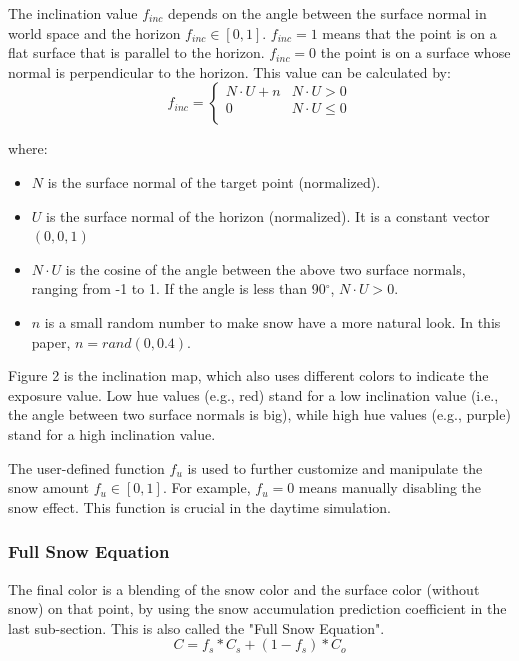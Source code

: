 \documentclass{article}
\begin{document}
The inclination value \( f_{inc} \) depends on the angle between the surface normal in world space and the horizon 
\( f_{inc} \in [0, 1] \). \( f_{inc}=1 \) means that the point is on a flat surface that is parallel to the horizon. 
\( f_{inc}=0 \) the point is on a surface whose normal is perpendicular to the horizon. This value can be calculated by:
\[
  f_{inc}=
  \left\{
    \begin{array}{ll}
      N \cdot U + n & N \cdot U > 0 \\
      0 & N \cdot U \leq 0 \\
    \end{array} 
  \right. 
\]

where:
\begin{itemize}
  \item \( N \) is the surface normal of the target point (normalized).
  \item \( U \) is the surface normal of the horizon (normalized). It is a constant vector \((0, 0, 1)\)
  \item \( N \cdot U \) is the cosine of the angle between the above two surface normals, ranging from -1 to 1. If the angle is less 
  than 90$^{\circ}$, \( N \cdot U > 0\).
  \item \( n \) is a small random number to make snow have a more natural look. In this paper, \(n = rand(0, 0.4)\).
\end{itemize}

Figure 2 is the inclination map, which also uses different colors to indicate the exposure value. Low hue values (e.g., red) stand for 
a low inclination value (i.e., the angle between two surface normals is big), while high hue values (e.g., purple) stand for a high 
inclination value.

The user-defined function \( f_{u} \) is used to further customize and manipulate the snow amount \( f_{u} \in [0, 1] \). For example, 
\( f_{u}=0 \) means manually disabling the snow effect. This function is crucial in the daytime simulation.

\subsubsection {Full Snow Equation}
The final color is a blending of the snow color and the surface color (without snow) on that point, by using the snow accumulation 
prediction coefficient in the last sub-section. This is also called the "Full Snow Equation".
\[
  C = f_{s} * C_{s} + (1-f_{s}) * C_{o}
\]
\end{document}
